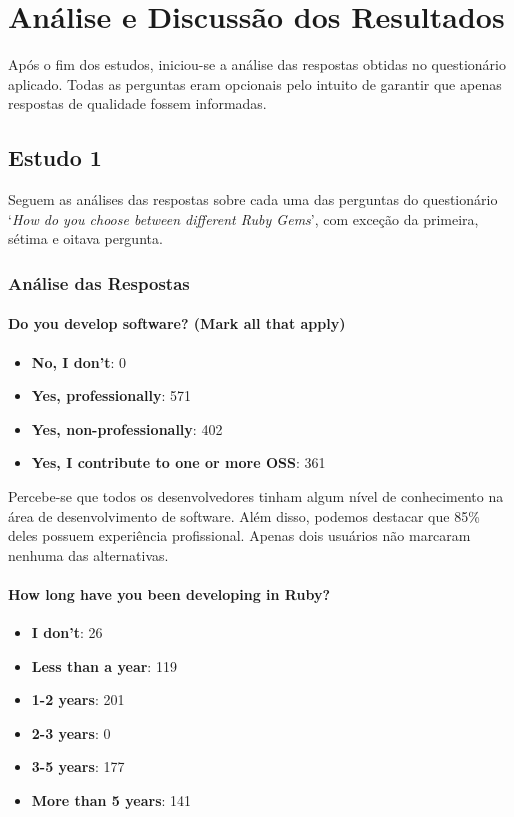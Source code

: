 \chapter{Análise e Discussão dos Resultados}

Após o fim dos estudos, iniciou-se a análise das respostas obtidas no questionário aplicado. Todas as perguntas eram opcionais pelo intuito de garantir que apenas respostas de qualidade fossem informadas.

\section{Estudo 1}

Seguem as análises das respostas sobre cada uma das perguntas do questionário `\textit{How do you choose between different Ruby Gems}', com exceção da primeira, sétima e oitava pergunta. 

\subsection{Análise das Respostas}


  \subsubsection{Do you develop software? (Mark all that apply)}

  \begin{itemize}
    \item \textbf{No, I don't}: 0
    \item \textbf{Yes, professionally}: 571
    \item \textbf{Yes, non-professionally}: 402
    \item \textbf{Yes, I contribute to one or more OSS}: 361
  \end{itemize}
  
  Percebe-se que todos os desenvolvedores tinham algum nível de conhecimento na área de desenvolvimento de software. Além disso, podemos destacar que 85\% deles possuem experiência profissional. Apenas dois usuários não marcaram nenhuma das alternativas.
  
  \subsubsection{How long have you been developing in Ruby?}
  
  \begin{itemize}
    \item \textbf{I don't}: 26
    \item \textbf{Less than a year}: 119
    \item \textbf{1-2 years}: 201
    \item \textbf{2-3 years}: 0
    \item \textbf{3-5 years}: 177
    \item \textbf{More than 5 years}: 141
  \end{itemize}
  
